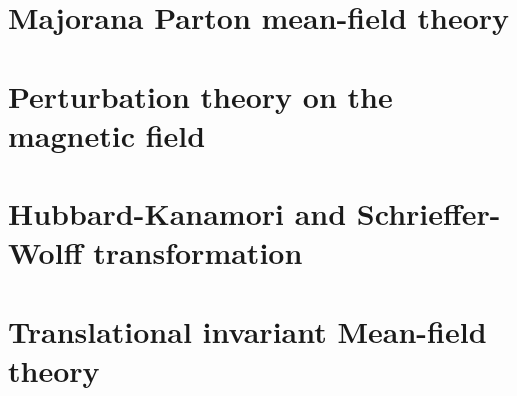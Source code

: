\chapter{Majorana Parton mean-field theory}%
\label{App-MF}%

\chapter{Perturbation theory on the magnetic field}%
\label{App-pertubation}%

\chapter{Hubbard-Kanamori and Schrieffer-Wolff transformation}%
\label{App-micro}%

\chapter{Translational invariant Mean-field theory}%
\label{App-translational}%

%

\backmatter


\printbibliography


